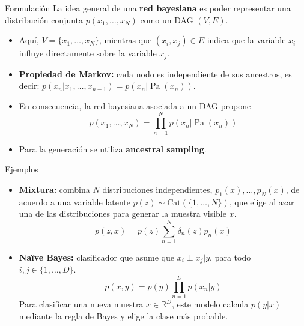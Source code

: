 \documentclass{beamer}
\newcommand{\R}{\mathbb{R}}
\begin{document}
\begin{frame}{Formulación}
    La idea general de una \textbf{red bayesiana} es poder representar una distribución conjunta $p(x_1,\ldots,x_N)$ como un DAG $(V,E)$.
    \begin{itemize}
        \item Aquí, $V=\{x_1,\ldots,x_N\}$, mientras que $(x_i,x_j)\in E$ indica que la variable $x_i$ influye directamente sobre la variable $x_j$.
        \item \textbf{Propiedad de Markov:} cada nodo es independiente de sus ancestros, es decir: $p(x_n|x_1,\ldots,x_{n-1})=p(x_n|\operatorname{Pa}(x_n))$.
        \item En consecuencia, la red bayesiana asociada a un DAG propone
              \begin{equation*}
                  p(x_1,\ldots,x_N)=\prod_{n=1}^N
                  p(x_n|\operatorname{Pa}(x_n))
              \end{equation*}
        \item Para la generación se utiliza \textbf{ancestral sampling}.
    \end{itemize}
\end{frame}

\begin{frame}{Ejemplos}
    \begin{itemize}
        \item \textbf{Mixtura:} combina $N$ distribuciones independientes, $p_1(x),\ldots,p_N(x)$, de acuerdo a una variable latente $p(z)\sim\text{Cat}(\{1,\ldots,N\})$, que elige al azar una de las distribuciones para generar la muestra visible $x$.
              \begin{equation*}
                  p(z,x)=p(z)\sum_{n=1}^N \delta_{n}(z)p_n(x)
              \end{equation*}
        \item \textbf{Naïve Bayes:} clasificador que asume que $x_i\perp x_j|y$, para todo $i,j\in\{1,\ldots,D\}.$
              \begin{equation*}
                  p(x,y)=p(y)\prod_{n=1}^D p(x_n|y)
              \end{equation*}
              Para clasificar una nueva muestra $x\in\R^D$, este modelo calcula $p(y|x)$ mediante la regla de Bayes y elige la clase más probable.
    \end{itemize}
\end{frame}
\end{document}

